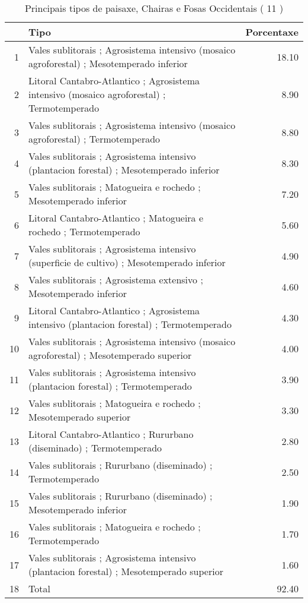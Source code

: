 \begin{table}[p]
\centering
\caption{Principais tipos de paisaxe,  Chairas e Fosas Occidentais ( 11 )} 
\label{Tipos 11}
\begin{tabular}{rlr}
  \hline
 & Tipo & Porcentaxe \\ 
  \hline
1 & Vales sublitorais ; Agrosistema intensivo (mosaico agroforestal) ; Mesotemperado inferior & 18.10 \\ 
  2 & Litoral Cantabro-Atlantico ; Agrosistema intensivo (mosaico agroforestal) ; Termotemperado & 8.90 \\ 
  3 & Vales sublitorais ; Agrosistema intensivo (mosaico agroforestal) ; Termotemperado & 8.80 \\ 
  4 & Vales sublitorais ; Agrosistema intensivo (plantacion forestal) ; Mesotemperado inferior & 8.30 \\ 
  5 & Vales sublitorais ; Matogueira e rochedo ; Mesotemperado inferior & 7.20 \\ 
  6 & Litoral Cantabro-Atlantico ; Matogueira e rochedo ; Termotemperado & 5.60 \\ 
  7 & Vales sublitorais ; Agrosistema intensivo (superficie de cultivo) ; Mesotemperado inferior & 4.90 \\ 
  8 & Vales sublitorais ; Agrosistema extensivo ; Mesotemperado inferior & 4.60 \\ 
  9 & Litoral Cantabro-Atlantico ; Agrosistema intensivo (plantacion forestal) ; Termotemperado & 4.30 \\ 
  10 & Vales sublitorais ; Agrosistema intensivo (mosaico agroforestal) ; Mesotemperado superior & 4.00 \\ 
  11 & Vales sublitorais ; Agrosistema intensivo (plantacion forestal) ; Termotemperado & 3.90 \\ 
  12 & Vales sublitorais ; Matogueira e rochedo ; Mesotemperado superior & 3.30 \\ 
  13 & Litoral Cantabro-Atlantico ; Rururbano (diseminado) ; Termotemperado & 2.80 \\ 
  14 & Vales sublitorais ; Rururbano (diseminado) ; Termotemperado & 2.50 \\ 
  15 & Vales sublitorais ; Rururbano (diseminado) ; Mesotemperado inferior & 1.90 \\ 
  16 & Vales sublitorais ; Matogueira e rochedo ; Termotemperado & 1.70 \\ 
  17 & Vales sublitorais ; Agrosistema intensivo (plantacion forestal) ; Mesotemperado superior & 1.60 \\ 
  18 & Total & 92.40 \\ 
   \hline
\end{tabular}
\end{table}
